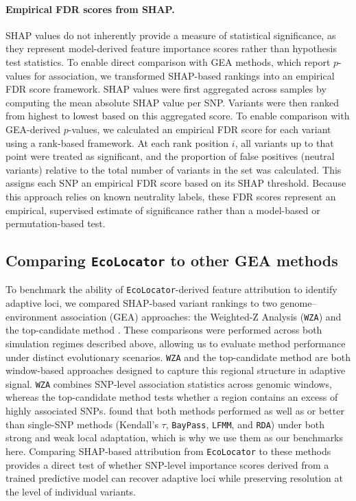 \documentclass[]{article}
\newcommand{\ecolocator}{\texttt{EcoLocator}\xspace}
\begin{document}
\paragraph{Empirical FDR scores from SHAP.}
SHAP values do not inherently provide a measure of statistical significance,
as they represent model-derived feature importance scores
rather than hypothesis test statistics.
To enable direct comparison with GEA methods,
which report $p$-values for association,
we transformed SHAP-based rankings into an empirical FDR score framework.
SHAP values were first aggregated across samples
by computing the mean absolute SHAP value per SNP.
Variants were then ranked from highest to lowest
based on this aggregated score.
To enable comparison with GEA-derived $p$-values,
we calculated an empirical FDR score for each variant
using a rank-based framework.
At each rank position $i$,
all variants up to that point were treated as significant,
and the proportion of false positives
(neutral variants)
relative to the total number of variants in the set
was calculated.
This assigns each SNP an empirical FDR score
based on its SHAP threshold.
Because this approach relies on known neutrality labels,
these FDR scores represent an empirical,
supervised estimate of significance
rather than a model-based or permutation-based test.


\subsection{Comparing \ecolocator to other GEA methods}

To benchmark the ability of \ecolocator-derived feature attribution
to identify adaptive loci,
we compared SHAP-based variant rankings
to two genome--environment association (GEA) approaches:
the Weighted-Z Analysis (\texttt{WZA}) \citep{booker_wza_2024}
and the top-candidate method \citep{yeaman_convergent_2016}.
These comparisons were performed across both simulation regimes
described above,
allowing us to evaluate method performance
under distinct evolutionary scenarios.
\texttt{WZA} and the top-candidate method
are both window-based approaches designed to capture
this regional structure in adaptive signal.
\texttt{WZA} combines SNP-level association statistics across genomic windows,
whereas the top-candidate method tests whether a region
contains an excess of highly associated SNPs.
\citet{booker_wza_2024} found that both methods
performed as well as or better than single-SNP methods
(Kendall's $\tau$, \texttt{BayPass}, \texttt{LFMM}, and \texttt{RDA})
under both strong and weak local adaptation,
which is why we use them as our benchmarks here.
Comparing SHAP-based attribution from \ecolocator to these methods
provides a direct test of whether SNP-level importance scores
derived from a trained predictive model
can recover adaptive loci while preserving resolution
at the level of individual variants.
\end{document}

